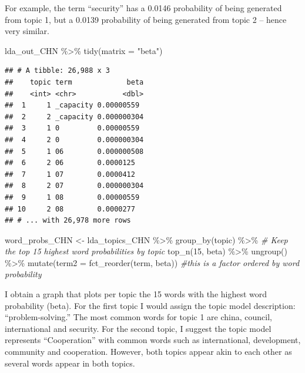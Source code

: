 \documentclass[
]{article}
\newenvironment{Shaded}{\begin{snugshade}}{\end{snugshade}}
\newcommand{\AttributeTok}[1]{\textcolor[rgb]{0.77,0.63,0.00}{#1}}
\newcommand{\CommentTok}[1]{\textcolor[rgb]{0.56,0.35,0.01}{\textit{#1}}}
\newcommand{\DecValTok}[1]{\textcolor[rgb]{0.00,0.00,0.81}{#1}}
\newcommand{\FunctionTok}[1]{\textcolor[rgb]{0.00,0.00,0.00}{#1}}
\newcommand{\NormalTok}[1]{#1}
\newcommand{\OtherTok}[1]{\textcolor[rgb]{0.56,0.35,0.01}{#1}}
\newcommand{\SpecialCharTok}[1]{\textcolor[rgb]{0.00,0.00,0.00}{#1}}
\newcommand{\StringTok}[1]{\textcolor[rgb]{0.31,0.60,0.02}{#1}}
\begin{document}
For example, the term ``security'' has a 0.0146 probability of being
generated from topic 1, but a 0.0139 probability of being generated from
topic 2 -- hence very similar.

\begin{Shaded}
\begin{Highlighting}[]
\NormalTok{lda\_out\_CHN }\SpecialCharTok{\%\textgreater{}\%}  
 \FunctionTok{tidy}\NormalTok{(}\AttributeTok{matrix =} \StringTok{"beta"}\NormalTok{) }
\end{Highlighting}
\end{Shaded}

\begin{verbatim}
## # A tibble: 26,988 x 3
##    topic term             beta
##    <int> <chr>           <dbl>
##  1     1 _capacity 0.00000559 
##  2     2 _capacity 0.000000304
##  3     1 0         0.00000559 
##  4     2 0         0.000000304
##  5     1 06        0.000000508
##  6     2 06        0.0000125  
##  7     1 07        0.0000412  
##  8     2 07        0.000000304
##  9     1 08        0.00000559 
## 10     2 08        0.0000277  
## # ... with 26,978 more rows
\end{verbatim}

\begin{Shaded}
\begin{Highlighting}[]
\NormalTok{word\_probs\_CHN }\OtherTok{\textless{}{-}}\NormalTok{ lda\_topics\_CHN }\SpecialCharTok{\%\textgreater{}\%}  
  \FunctionTok{group\_by}\NormalTok{(topic) }\SpecialCharTok{\%\textgreater{}\%}  \CommentTok{\# Keep the top 15 highest word probabilities by topic}
  \FunctionTok{top\_n}\NormalTok{(}\DecValTok{15}\NormalTok{, beta) }\SpecialCharTok{\%\textgreater{}\%}  
  \FunctionTok{ungroup}\NormalTok{() }\SpecialCharTok{\%\textgreater{}\%} 
  \FunctionTok{mutate}\NormalTok{(}\AttributeTok{term2 =} \FunctionTok{fct\_reorder}\NormalTok{(term, beta)) }\CommentTok{\#this is a factor ordered by word probability}
\end{Highlighting}
\end{Shaded}

I obtain a graph that plots per topic the 15 words with the highest word
probability (beta). For the first topic I would assign the topic model
description: ``problem-solving.'' The most common words for topic 1 are
china, council, international and security. For the second topic, I
suggest the topic model represents ``Cooperation'' with common words
such as international, development, community and cooperation. However,
both topics appear akin to each other as several words appear in both
topics.
\end{document}
